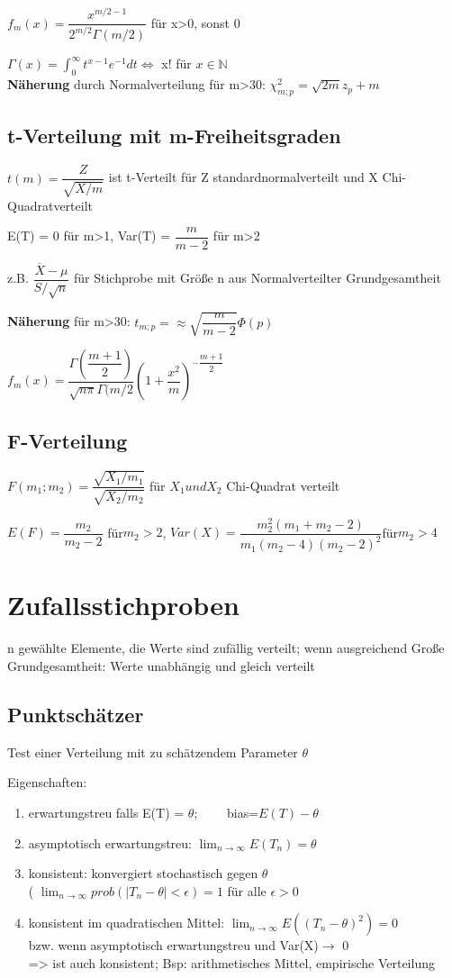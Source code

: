 $f_m(x) = \dfrac{x^{m/2-1}}{2^{m/2}\Gamma(m/2)}$ für x>0, sonst 0

$\Gamma (x) = \int_0 ^\infty t^{x-1} e^{-1}dt \Leftrightarrow$  x! für $x \in \mathbb{N}$ \\
\textbf{Näherung} durch Normalverteilung für m>30: $\chi^2_{m;p} = \sqrt{2m}z_p +m$

\subsection*{t-Verteilung  mit m-Freiheitsgraden}
$t(m) = \dfrac{Z}{\sqrt{X/m}}$ ist t-Verteilt für Z standardnormalverteilt und X Chi-Quadratverteilt

E(T) = 0 für m>1, Var(T) = $\dfrac{m}{m-2}$ für m>2

z.B. $\dfrac{\overline{X} -\mu }{S/\sqrt{n}}$ für Stichprobe mit Größe n aus Normalverteilter Grundgesamtheit

\textbf{Näherung} für m>30: $t_{m;p} = \approx \sqrt{\dfrac{m}{m-2}} \Phi(p)$

$f_m(x) = \dfrac{\Gamma\left(\dfrac{m+1}{2}\right)}{\sqrt{n\pi}\Gamma( m/2} \left( 1+ \dfrac{x^2}{m}\right)^{-\dfrac{m+1}{2}}$

\subsection*{F-Verteilung}
$F(m_1;m_2) = \dfrac{\sqrt{X_1/m_1}}{\sqrt{X_2/m_2}}$ für $X_1 und X_2$ Chi-Quadrat verteilt

$E(F) = \dfrac{m_2}{m_2-2}$ für$ m_2 > 2$, $Var(X) = \dfrac{m_2^2(m_1+m_2-2)}{m_1(m_2-4)(m_2-2)^2} $für$ m_2 >4$

\section*{Zufallsstichproben}
n gewählte Elemente, die Werte sind zufällig verteilt; wenn ausgreichend Große Grundgesamtheit: Werte unabhängig und gleich verteilt

\subsection*{Punktschätzer}
Test einer Verteilung mit zu schätzendem Parameter $\theta$

Eigenschaften:
\begin{enumerate}
\item erwartungstreu falls E(T) = $\theta$;~~~~ bias=$E(T)-\theta$
\item asymptotisch erwartungstreu: $\lim_{n\rightarrow \infty} E(T_n) = \theta$
\item konsistent: konvergiert stochastisch gegen $\theta$ \\
( $\lim_{n\rightarrow \infty} prob (|T_n - \theta| <\epsilon ) = 1$ für alle $\epsilon >0 $
\item konsistent im quadratischen Mittel: $\lim_{n\rightarrow \infty} E((T_n-\theta)^2) = 0$\\
bzw. wenn asymptotisch erwartungstreu und Var(X)$\rightarrow$ 0 \\
=> ist auch konsistent; Bsp: arithmetisches Mittel, empirische Verteilung
\end{enumerate}


